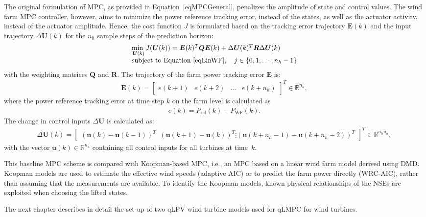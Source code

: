 The original formulation of MPC, as provided in Equation~\eqref{eqMPCGeneral}, penalizes the amplitude of state and control values. The wind farm MPC controller, however, aims to minimize the power reference tracking error, instead of the states, as well as the actuator activity, instead of the actuator amplitude. Hence, the cost function $J$ is formulated based on the tracking error trajectory $\bm{E}(k)$ and the input trajectory $\Delta \bm{U}(k)$ for the $n_h$ sample steps of the prediction horizon:
\begin{align} \label{eqObjFun1}
    \begin{array}{l} 
        \underset{\bm{U}(k)}{\text{min }} J(\bm{U}(k)) = \bm{E}(k)^T \bm{Q}\bm{E}(k) +\Delta \bm{U}(k)^T \bm{R} \Delta \bm{U}(k) \\
        \text{subject to Equation } \eqref{eqLinWF}, \quad   j \in \{0, 1, \dots, n_h-1\}
    \end{array}
\end{align}
%
with the weighting matrices $\bm{Q}$ and $\bm{R}$. The trajectory of the farm power tracking error $\bm{E}$ is:
\begin{align*}
    \bm{E}(k) = \begin{bmatrix} e(k+1) & e(k+2) & \dots & e(k + n_h) \end{bmatrix}^T \in \mathbb{R}^{n_h },
\end{align*}
where the power reference tracking error at time step $k$ on the farm level is calculated as 
\begin{align*}
    e(k) = P_{\text{ref}}(k) - P_{\text{WF}}(k). 
\end{align*}
%
The change in control inputs $\Delta \bm{U}$ is calculated as:
\begin{align*}
    \Delta \bm{U}(k) = \begin{bmatrix} (\bm{u}(k) - \bm{u}(k-1))^T \;\; (\bm{u}(k+1) - \bm{u}(k))^T \vdots  (\bm{u}(k+n_h - 1) - \bm{u}(k + n_h - 2))^T \end{bmatrix}^T \in \mathbb{R}^{n_h n_u },
\end{align*}
with the vector $\bm{u}(k) \in \mathbb{R}^{n_u }$ containing all control inputs for all turbines at time~$k$.

This baseline MPC scheme is compared with Koopman-based MPC, i.e., an MPC based on a linear wind farm model derived using DMD. Koopman models are used to estimate the effective wind speeds (adaptive AIC) or to predict the farm power directly (WRC-AIC), rather than assuming that the measurements are available. To identify the Koopman models, known physical relationships of the NSEs are exploited when choosing the lifted states.

The next chapter describes in detail the set-up of two qLPV wind turbine models used for qLMPC for wind turbines.